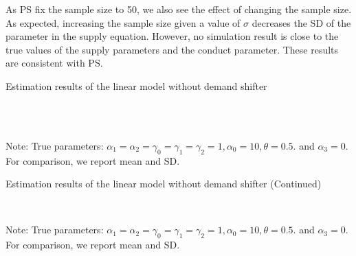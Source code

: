 \documentclass[11pt, a4paper]{article}
\begin{document}
As PS fix the sample size to 50, we also see the effect of changing the sample size.
As expected, increasing the sample size given a value of $\sigma$ decreases the SD of the parameter in the supply equation.
However, no simulation result is close to the true values of the supply parameters and the conduct parameter.
These results are consistent with PS.

\begin{table}[!htbp]
  \begin{center}
      \caption{Estimation results of the linear model without demand shifter}
      \label{tb:linear_linear_sigma_1_without_demand_shifter_y} 
      \subfloat[$\sigma=0.001$]{}\\
      \subfloat[$\sigma=0.5$]{}\\
  \end{center}\footnotesize
  Note: True parameters: $\alpha_1 = \alpha_2 =  \gamma_0 = \gamma_1 = \gamma_2  =  1, \alpha_0 = 10, \theta = 0.5.$ and $\alpha_3 =0$. For comparison, we report mean and SD.
\end{table} 

\begin{table}[!htbp]
  \ContinuedFloat
  \begin{center}
      \caption{Estimation results of the linear model without demand shifter (Continued)}
      \subfloat[$\sigma=1.0$]{}\\
    \subfloat[$\sigma=2.0$]{}
  \end{center}\footnotesize
  Note: True parameters: $\alpha_1 = \alpha_2 =  \gamma_0 = \gamma_1 = \gamma_2  =  1, \alpha_0 = 10, \theta = 0.5.$ and $\alpha_3 =0$. For comparison, we report mean and SD.
\end{table} 
\end{document}
